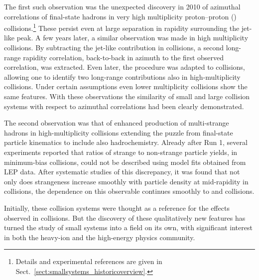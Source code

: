 \documentclass[../report.tex]{subfiles}
\begin{document}
The first such observation was the unexpected discovery in 2010 of azimuthal correlations of final-state hadrons in very high multiplicity proton--proton (\pp) collisions.\footnote{Details and experimental references are given in Sect.~\ref{sect:smallsystems_historicoverview}.} These persist even at large separation in rapidity surrounding the jet-like peak. A few years later, a similar observation was made in high multiplicity \pPb collisions. By subtracting the jet-like contribution in \pPb collisions, a second long-range rapidity correlation, back-to-back in azimuth to the first observed correlation, was extracted. Even later, the procedure was adapted to \pp collisions, allowing one to identify two long-range contributions also in high-multiplicity \pp collisions. Under certain assumptions even lower multiplicity \pp collisions show the same features. With these observations the similarity of small and large collision systems with respect to azimuthal correlations had been clearly demonstrated.

The second observation was that of enhanced production of multi-strange hadrons in high-multiplicity \pp collisions extending the puzzle from final-state particle kinematics to include also hadrochemistry. Already after Run 1, several experiments reported that ratios of strange to non-strange particle yields, in minimum-bias collisions, could not be described using model fits obtained from LEP data. After systematic studies of this discrepancy, it was found that not only does strangeness increase smoothly with particle density at mid-rapidity in \pp collisions, the dependence on this observable continues smoothly to \pPb and \PbPb collisions.

Initially, these collision systems were thought as a reference for the effects observed in \PbPb collisions. But the discovery of these qualitatively new features has turned the study of small systems into a field on its own, with significant interest in both the heavy-ion and the high-energy physics community.
\end{document}
